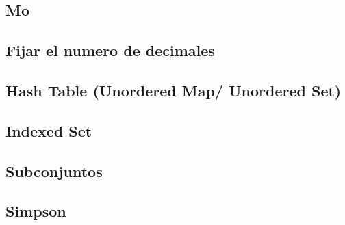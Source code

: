 \documentclass[a4paper,11pt,landscape,twocolumn]{article}
\begin{document}
\subsection{Mo}



\subsection{Fijar el numero de decimales}



\subsection{Hash Table (Unordered Map/ Unordered Set)}



\subsection{Indexed Set}



\subsection{Subconjuntos}



\subsection{Simpson}


\end{document}
